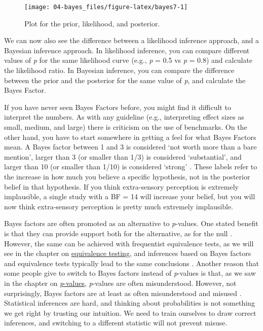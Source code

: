 \documentclass[
  oneside]{book}
\begin{document}
\begin{figure}

{\centering \texttt{[image: 04-bayes\_files/figure-latex/bayes7-1]} 

}

\caption{Plot for the prior, likelihood, and posterior.}\label{fig:bayes7}
\end{figure}

We can now also see the difference between a likelihood inference approach, and a Bayesian inference approach. In likelihood inference, you can compare different values of \emph{p} for the same likelihood curve (e.g., \emph{p} = 0.5 vs \emph{p} = 0.8) and calculate the likelihood ratio. In Bayesian inference, you can compare the difference between the prior and the posterior for the same value of \emph{p}, and calculate the Bayes Factor.

If you have never seen Bayes Factors before, you might find it difficult to interpret the numbers. As with any guideline (e.g., interpreting effect sizes as small, medium, and large) there is criticism on the use of benchmarks. On the other hand, you have to start somewhere in getting a feel for what Bayes Factors mean. A Bayes factor between 1 and 3 is considered `not worth more than a bare mention', larger than 3 (or smaller than 1/3) is considered `substantial', and larger than 10 (or smaller than 1/10) is considered `strong' \citep{jeffreys_theory_1939}. These labels refer to the increase in how much you believe a specific hypothesis, not in the posterior belief in that hypothesis. If you think extra-sensory perception is extremely implausible, a single study with a BF = 14 will increase your belief, but you will now think extra-sensory perception is pretty much extremely implausible.

Bayes factors are often promoted as an alternative to \emph{p}-values. One stated benefit is that they can provide support both for the alternative, as for the null \citep{dienes_using_2014}. However, the same can be achieved with frequentist equivalence tests, as we will see in the chapter on \protect\hyperlink{equivalencetest}{equivalence testing}, and inferences based on Bayes factors and equivalence tests typically lead to the same conclusions \citep{lakens_improving_2020}. Another reason that some people give to switch to Bayes factors instead of \emph{p}-values is that, as we saw in the chapter on \protect\hyperlink{misconceptions}{\emph{p}-values}, \emph{p}-values are often misunderstood. However, not surprisingly, Bayes factors are at least as often misunderstood and misused \citep{wong_potential_2021}. Statistical inferences are hard, and thinking about probabilities is not something we get right by trusting our intuition. We need to train ourselves to draw correct inferences, and switching to a different statistic will not prevent misuse.
\end{document}
